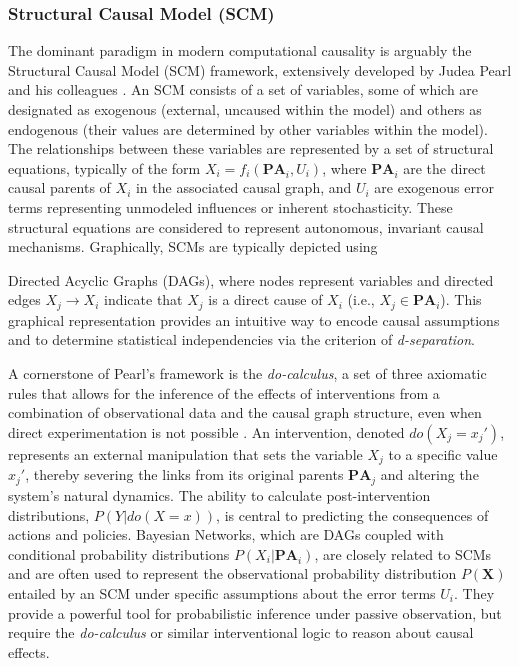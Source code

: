 \subsubsection{Structural Causal Model (SCM)}

The dominant paradigm in modern computational causality is arguably the Structural Causal Model (SCM) framework, extensively developed by Judea Pearl and his colleagues \cite{Pearl2009Causality}. An SCM consists of a set of variables, some of which are designated as exogenous (external, uncaused within the model) and others as endogenous (their values are determined by other variables within the model). The relationships between these variables are represented by a set of structural equations, typically of the form $X_i = f_i(\mathbf{PA}_i, U_i)$, where \(\mathbf{PA}_i\) are the direct causal parents of $X_i$ in the associated causal graph, and $U_i$ are exogenous error terms representing unmodeled influences or inherent stochasticity. These structural equations are considered to represent autonomous, invariant causal mechanisms. Graphically, SCMs are typically depicted using {Directed Acyclic Graphs (DAGs), where nodes represent variables and directed edges $X_j \to X_i$ indicate that $X_j$ is a direct cause of $X_i$ (i.e., $X_j \in \mathbf{PA}_i$). This graphical representation provides an intuitive way to encode causal assumptions and to determine statistical independencies via the criterion of \textit{d-separation}.

A cornerstone of Pearl's framework is the \textit{do-calculus}, a set of three axiomatic rules that allows for the inference of the effects of interventions from a combination of observational data and the causal graph structure, even when direct experimentation is not possible \cite{Pearl2009Causality}. An intervention, denoted $do(X_j=x_j')$, represents an external manipulation that sets the variable $X_j$ to a specific value $x_j'$, thereby severing the links from its original parents $\mathbf{PA}_j$ and altering the system's natural dynamics. The ability to calculate post-intervention distributions, $P(Y | do(X=x))$, is central to predicting the consequences of actions and policies. Bayesian Networks, which are DAGs coupled with conditional probability distributions $P(X_i | \mathbf{PA}_i)$, are closely related to SCMs and are often used to represent the observational probability distribution $P(\mathbf{X})$ entailed by an SCM under specific assumptions about the error terms $U_i$. They provide a powerful tool for probabilistic inference under passive observation, but require the \textit{do-calculus} or similar interventional logic to reason about causal effects.

}
